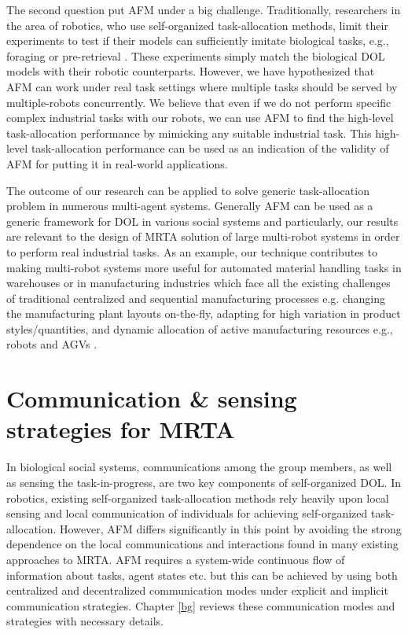 The second question put AFM under a big challenge. Traditionally, researchers in the area of robotics, who use self-organized task-allocation methods, limit their experiments to test if their models can sufficiently imitate biological tasks, e.g., foraging \cite{Krieger+2000} or pre-retrieval \cite{Labella2007}. These experiments simply match the biological DOL models with their robotic counterparts. However, we have hypothesized that AFM can work under real task settings where multiple tasks should be served by multiple-robots concurrently. We believe that even if we do not perform specific complex industrial tasks with our robots, we can use AFM to find the high-level task-allocation performance by mimicking any suitable industrial task. This high-level task-allocation performance can be used as an indication of the validity of AFM for putting it in real-world applications.

The outcome of our research can be applied to solve generic task-allocation problem in numerous multi-agent systems. Generally AFM can be used as a generic framework for DOL in various social systems and particularly, our results are relevant to the design of MRTA solution of large multi-robot systems in order to perform real industrial tasks. As an example, our technique contributes to making multi-robot systems more useful for automated material handling tasks in warehouses or in manufacturing industries which face all the existing challenges of traditional centralized and sequential manufacturing processes e.g. changing the manufacturing plant layouts on-the-fly, adapting for high variation in product styles/quantities, and dynamic allocation of active manufacturing resources e.g., robots and \acfp{AGV} \cite{Shen+2006}.
% 
\section{Communication \& sensing strategies for MRTA}
\label{intro:comm}
In biological social systems, communications among the group members, as well as sensing the task-in-progress, are two key components of self-organized DOL. In robotics, existing self-organized task-allocation methods rely heavily upon local sensing and local communication of individuals for achieving self-organized task-allocation. However, AFM differs significantly in this point by avoiding the strong dependence on the local communications and interactions found in many existing approaches to MRTA. AFM requires a system-wide continuous flow of information about tasks, agent states etc. but this can be achieved by using both centralized and decentralized communication modes under explicit and implicit communication strategies. Chapter \ref{bg} reviews these communication modes and strategies with necessary details.

